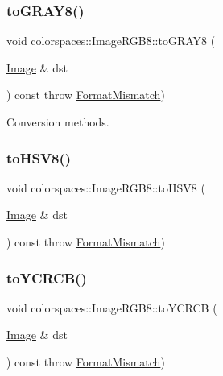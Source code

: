 \subsubsection{\texorpdfstring{to\+G\+R\+A\+Y8()}{toGRAY8()}}
{\footnotesize\ttfamily void colorspaces\+::\+Image\+R\+G\+B8\+::to\+G\+R\+A\+Y8 (\begin{DoxyParamCaption}\item[{\hyperlink{classcolorspaces_1_1_image}{Image} \&}]{dst }\end{DoxyParamCaption}) const throw  \hyperlink{classcolorspaces_1_1_image_1_1_format_mismatch}{Format\+Mismatch}) }

Conversion methods. \mbox{\label{classcolorspaces_1_1_image_r_g_b8_a7abf7473312776fffdd2aeca422c62ff}} 
\subsubsection{\texorpdfstring{to\+H\+S\+V8()}{toHSV8()}}
{\footnotesize\ttfamily void colorspaces\+::\+Image\+R\+G\+B8\+::to\+H\+S\+V8 (\begin{DoxyParamCaption}\item[{\hyperlink{classcolorspaces_1_1_image}{Image} \&}]{dst }\end{DoxyParamCaption}) const throw  \hyperlink{classcolorspaces_1_1_image_1_1_format_mismatch}{Format\+Mismatch}) }

\mbox{\label{classcolorspaces_1_1_image_r_g_b8_afd40b7e2468a59bd82bd307e5ab55224}} 
\subsubsection{\texorpdfstring{to\+Y\+C\+R\+C\+B()}{toYCRCB()}}
{\footnotesize\ttfamily void colorspaces\+::\+Image\+R\+G\+B8\+::to\+Y\+C\+R\+CB (\begin{DoxyParamCaption}\item[{\hyperlink{classcolorspaces_1_1_image}{Image} \&}]{dst }\end{DoxyParamCaption}) const throw  \hyperlink{classcolorspaces_1_1_image_1_1_format_mismatch}{Format\+Mismatch}) }

